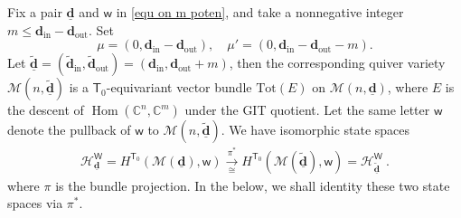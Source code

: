 \documentclass[10pt]{amsart}
\theoremstyle{definition}
\numberwithin{equation}{section}
\newcommand{\bC}{\mathbb{C}}
\newcommand{\bd}{\mathbf{d}}
\newcommand{\cH}{\mathcal{H}}
\newcommand{\cM}{\mathcal{M}}
\newcommand{\sT}{\mathsf{T}}
\newcommand{\sW}{\mathsf{W}}
\newcommand{\sw}{\mathsf{w}}
\newcommand{\Hom}{\operatorname{Hom}}
\newcommand{\In}{\operatorname{in}}
\newcommand{\Out}{\operatorname{out}}
\begin{document}
Fix a pair $\underline{\bd}$ and $\sw$ in \eqref{equ on m poten}, and take a nonnegative integer $m\leqslant \bd_{\In}-\bd_{\Out}$. Set 
\begin{equation}\label{equ on mumu'}\mu=(0,\bd_{\In}-\bd_{\Out}), \quad \mu'=(0,\bd_{\In}-\bd_{\Out}-m). \end{equation} 
Let $\underline{\widetilde{\bd}}=(\widetilde{\bd}_{\In},\widetilde{\bd}_{\Out})=(\bd_{\In},\bd_{\Out}+m)$, then the corresponding quiver variety $\cM(n,\underline{\widetilde{\bd}})$ is a $\sT_0$-equivariant vector bundle $\mathrm{Tot}(E)$ on $\cM(n,\underline{\bd})$, where $E$ is the descent of $\Hom(\bC^n,\bC^m)$ under the GIT quotient. Let the same letter $\sw$ denote the pullback of $\sw$ to $\cM(n,\underline{\widetilde{\bd}})$. We have isomorphic state spaces
\begin{align*}
    \cH^{\sW}_{\underline{\bd}}=H^{\sT_0}(\cM(\underline{\bd}),\sw)\xrightarrow[\cong]{\pi^*} H^{\sT_0}(\cM(\underline{\widetilde{\bd}}),\sw)=\cH^{\sW}_{\underline{\widetilde{\bd}}}\:.
\end{align*}
where $\pi$ is the bundle projection. In the below, we shall identity these two state spaces via $\pi^*$.
\end{document}
